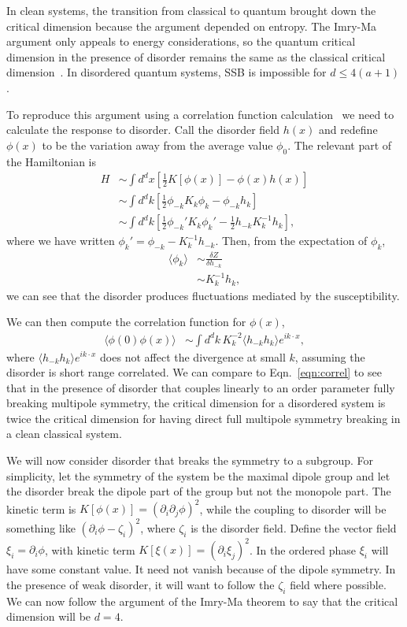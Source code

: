 \documentclass[pra,aps,twocolumn, amsfonts,amsmath,amssymb,nofootinbib,superscriptaddress]{revtex4-2}
\newcommand{\nn}{\nonumber\\}
\newcommand{\half}{\frac{1}{2}}
\begin{document}
In clean systems, the transition from classical to quantum brought down the critical dimension because the argument depended on entropy. The Imry-Ma argument only appeals to energy considerations, so the quantum critical dimension in the presence of disorder remains the same as the classical critical dimension~\cite{Vojta2013}. In disordered quantum systems, SSB is impossible for $d\le 4(a+1)$.

To reproduce this argument using a correlation function calculation~\cite{ImryMa} we need to calculate the response to disorder. Call the disorder field $h(x)$ and redefine $\phi(x)$ to be the variation away from the average value $\phi_0$. The relevant part of the Hamiltonian is 
\begin{align}
H &\sim \int d^dx \left[ \half K[ \phi(x)] - \phi(x) h(x) \right] \nn
&\sim \int d^dk \left[ \half \phi_{-k} K_k \phi_k - \phi_{-k} h_k \right] \nn
&\sim \int d^dk \left[ \half \phi_{-k}' K_k \phi_k' - \half h_{-k} K^{-1}_k h_k \right],
\end{align}
where we have written $\phi_k' = \phi_{-k} - K^{-1}_k h_{-k}$. Then, from the expectation of $\phi_k$,
\begin{align}
\langle \phi_k \rangle &\sim \frac{\delta Z}{\delta h_{-k} } \nn
&\sim K_k^{-1} h_{k},
\end{align}
we can see that the disorder produces fluctuations mediated by the susceptibility.

We can then compute the correlation function for $\phi(x)$,
\begin{align}
\langle \phi(0) \phi(x) \rangle &\sim \int d^dk \, K_k^{-2} \langle h_{-k} h_{k} \rangle e^{ik\cdot x},
\end{align}
where $\langle h_{-k} h_{k} \rangle e^{ik\cdot x}$ does not affect the divergence at small $k$, assuming the disorder is short range correlated. We can compare to Eqn.~\ref{eqn:correl} to see that in the presence of disorder that couples linearly to an order parameter fully breaking multipole symmetry, the critical dimension for a disordered system is twice the critical dimension for having direct full multipole symmetry breaking in a clean classical system.

We will now consider disorder that breaks the symmetry to a subgroup. For simplicity, let the symmetry of the system be the maximal dipole group and let the disorder break the dipole part of the group but not the monopole part. The kinetic term is $K[\phi(x)]= (\partial_i \partial_j \phi)^2$, while the coupling to disorder will be something like $(\partial_i\phi - \zeta_i)^2$, where $\zeta_i$ is the disorder field. 
Define the vector field $\xi_i = \partial_i\phi$, with kinetic term $K[\xi(x)]= (\partial_i \xi_j)^2$. In the ordered phase $\xi_i$ will have some constant value. It need not vanish because of the dipole symmetry. In the presence of weak disorder, it will want to follow the $\zeta_i$ field where possible. We can now follow the argument of the Imry-Ma theorem to say that the critical dimension will be $d=4$.
\end{document}
